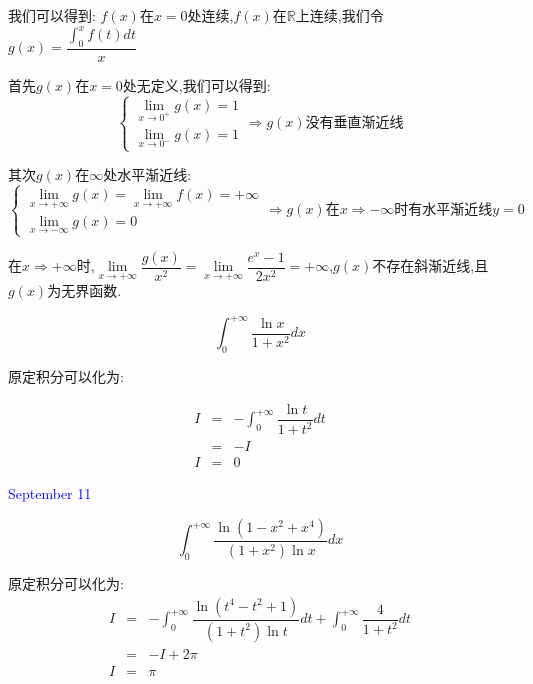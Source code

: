\begin{solution}

	我们可以得到:  $f(x)$在$x=0$处连续,$f(x)$在$\mathbb{R}$上连续,我们令$g(x)=\dfrac{\int_{0}^{x}f(t)dt}{x}$
	
	首先$g(x)$在$x=0$处无定义,我们可以得到:  
	$$\left\lbrace
	\begin{array}{l}
		\lim\limits_{x\to 0^{+}}g(x)=1\\
		\lim\limits_{x\to 0^{-}}g(x)=1
	\end{array}
	\right. \Rightarrow g(x)\text{没有垂直渐近线}$$
	
	其次$g(x)$在$\infty$处水平渐近线:  
	$$\left\lbrace
	\begin{array}{l}
		\lim\limits_{x\to+\infty}g(x)=\lim\limits_{x\to+\infty}f(x)=+\infty\\
		\lim\limits_{x\to-\infty}g(x)=0
	\end{array}
	\right. \Rightarrow g(x)\text{在}x\Rightarrow -\infty\text{时}\text{有水平渐近线}y=0$$
	
	在$x\Rightarrow +\infty$时,$\lim\limits_{x\to+\infty}\dfrac{g(x)}{x^2}=\lim\limits_{x\to +\infty}\dfrac{e^x-1}{2x^2}=+\infty$,$g(x)$不存在斜渐近线,且$g(x)$为无界函数.
	
\end{solution}

\begin{example}[][Exam: 35.2.6]
	$$\int_{0}^{+\infty}\dfrac{\ln x}{1+x^2}dx$$
\end{example}

\begin{solution}

	原定积分可以化为:  

	\begin{eqnarray*}
		I&=&-\int_{0}^{+\infty}\dfrac{\ln t}{1+t^2}dt\\
		&=&-I\\
		I&=&0
	\end{eqnarray*}
\end{solution}


\textcolor{blue}{September 11}

\begin{example}[][Exam: 35.2.7]
	$$\int_{0}^{+\infty}\dfrac{\ln(1-x^2+x^4)}{(1+x^2)\ln x}dx$$
\end{example}

\begin{solution}

	原定积分可以化为:  
	\begin{eqnarray*}
		I&=&-\int_{0}^{+\infty}\dfrac{\ln (t^4-t^2+1)}{(1+t^2)\ln t}dt+\int_{0}^{+\infty}\dfrac{4}{1+t^2}dt\\
		&=&-I+2\pi\\
		I&=&\pi
	\end{eqnarray*}
\end{solution}

